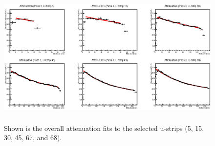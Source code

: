 \begin{figure}[h]
    \centering
    \includegraphics[height= 2.75in, keepaspectratio = true]{atpass5}
    \caption{Shown is the overall attenuation fits to the selected u-strips 
    (5, 15, 30, 45, 67, and 68).}
    \label{fig:atpass5}
\end{figure}


\FloatBarrier


